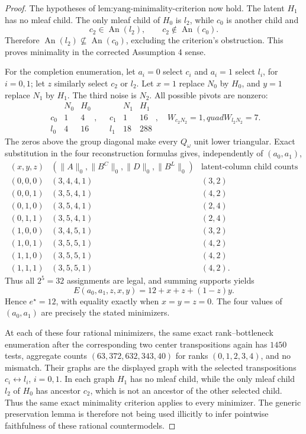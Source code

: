 \documentclass{article}
\begin{document}
\begin{proof}
The hypotheses of \(\text{lem:yang-minimality-criterion}\) now hold. The latent \(H_1\) has no mleaf child. The only mleaf child of \(H_0\) is \(l_2\), while \(c_0\) is another child and
\[
c_2\in\operatorname{An}(l_2),\qquad c_2\notin\operatorname{An}(c_0).
\]
Therefore \(\operatorname{An}(l_2)\nsubseteq\operatorname{An}(c_0)\), excluding the criterion's obstruction. This proves minimality in the corrected Assumption 4 sense.

For the completion enumeration, let \(a_i=0\) select \(c_i\) and \(a_i=1\) select \(l_i\), for \(i=0,1\); let \(z\) similarly select \(c_2\) or \(l_2\). Let \(x=1\) replace \(N_0\) by \(H_0\), and \(y=1\) replace \(N_1\) by \(H_1\). The third noise is \(N_2\). All possible pivots are nonzero:
\[
\begin{array}{c|cc}&N_0&H_0\\ \hline c_0&1&4\\l_0&4&16\end{array},
\quad
\begin{array}{c|cc}&N_1&H_1\\ \hline c_1&1&16\\l_1&18&288\end{array},
\quad W_{c_2N_2}=1,quad W_{l_2N_2}=7.
\]
The zeros above the group diagonal make every \(Q_\omega\) unit lower triangular. Exact substitution in the four reconstruction formulas gives, independently of \((a_0,a_1)\),
\[
\begin{array}{c|c|c}
(x,y,z)&(\|A\|_0,\|B^C\|_0,\|D\|_0,\|B^L\|_0)&\text{latent-column child counts}\\ \hline
(0,0,0)&(3,4,4,1)&(3,2)\\
(0,0,1)&(3,5,4,1)&(4,2)\\
(0,1,0)&(3,5,4,1)&(2,4)\\
(0,1,1)&(3,5,4,1)&(2,4)\\
(1,0,0)&(3,4,5,1)&(3,2)\\
(1,0,1)&(3,5,5,1)&(4,2)\\
(1,1,0)&(3,5,5,1)&(4,2)\\
(1,1,1)&(3,5,5,1)&(4,2).
\end{array}
\]
Thus all \(2^5=32\) assignments are legal, and summing supports yields
\[
E(a_0,a_1,z,x,y)=12+x+z+(1-z)y.
\]
Hence \(e^\star=12\), with equality exactly when \(x=y=z=0\). The four values of \((a_0,a_1)\) are precisely the stated minimizers.

At each of these four rational minimizers, the same exact rank--bottleneck enumeration after the corresponding two center transpositions again has \(1450\) tests, aggregate counts \((63,372,632,343,40)\) for ranks \((0,1,2,3,4)\), and no mismatch. Their graphs are the displayed graph with the selected transpositions \(c_i\leftrightarrow l_i\), \(i=0,1\). In each graph \(H_1\) has no mleaf child, while the only mleaf child \(l_2\) of \(H_0\) has ancestor \(c_2\), which is not an ancestor of the other selected child. Thus the same exact minimality criterion applies to every minimizer. The generic preservation lemma is therefore not being used illicitly to infer pointwise faithfulness of these rational countermodels.


\end{proof}
\end{document}
